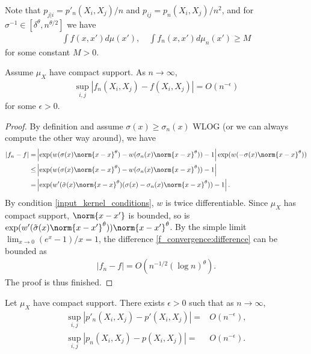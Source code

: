 Note that $p_{j|i} = p'_n(X_i,X_j)/n$ and $p_{ij} = p_n(X_i,X_j)/n^2$, and for $\sigma^{-1} \in [\delta^{\theta},n^{\theta/2}]$ we have
\begin{align} \label{tsne:important_bounds}
    \int f(x,x')d\mu(x'), \quad \int f_n(x,x')d\mu_n(x') \geq M
\end{align}
for some constant $M>0$.
\begin{lemma} \label{tsne:f_n_convergence_lemma}
    Assume $\mu_X$ have compact support. As $n \to \infty$,
    \begin{align}
        \sup_{i,j} \left|f_n(X_i,X_j) - f(X_i,X_j)\right| = O(n^{-\epsilon})
    \end{align}
    for some $\epsilon>0$.
\end{lemma}
\begin{proof}
    By definition and assume $\sigma(x) \geq \sigma_n(x)$ WLOG (or we can always compute the other way around), we have
    \begin{align} \label{f_convergence:difference}
        |f_n-f| = & \left|\exp(w(\sigma(x)\norm{x-x}^{\theta})-w(\sigma_n(x)\norm{x-x}^{\theta}))-1\right|\exp(w(-\sigma(x)\norm{x-x}^{\theta})) \nonumber \\
        \leq      & \left|\exp(w(\sigma(x)\norm{x-x}^{\theta})-w(\sigma_n(x)\norm{x-x}^{\theta}))-1\right| \nonumber                                       \\
        =         & \left|\exp(w'(\tilde{\sigma}(x)\norm{x-x}^{\theta})(\sigma(x)-\sigma_n(x)\norm{x-x}^{\theta}))-1\right|.
    \end{align}
    By condition \ref{input_kernel_conditions}, $w$ is twice differentiable. Since $\mu_X$ has compact support, $\norm{x-x'}$ is bounded, so is
    $\exp(w'(\tilde{\sigma}(x)\norm{x-x'}^{\theta}))\norm{x-x'}^{\theta}$. By the simple limit $\lim_{x \to 0}(e^x-1)/x = 1$, the difference \eqref{f_convergence:difference} can be bounded as
    \begin{align} \label{tsne:kw_bounds_1}
        |f_n-f| = O(n^{-1/2} (\log n)^{\theta}).
    \end{align}
    The proof is thus finished.
\end{proof}
\begin{lemma} \label{tsne:integrand_lemma_2}
    Let $\mu_X$ have compact support. There exists $\epsilon>0$ such that as $n \to \infty$,
    \begin{align}
        \sup_{i,j} \left|p'_n(X_i,X_j) - p'(X_i,X_j)\right| = & O(n^{-\epsilon}), \nonumber \\
        \sup_{i,j} \left|p_n(X_i,X_j) - p(X_i,X_j)\right| =   & O(n^{-\epsilon}) \nonumber.
    \end{align}
\end{lemma}

